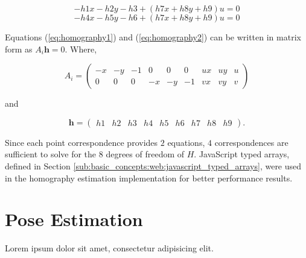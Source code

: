 \begin{equation}
\label{eq:homography1}
-h1x-h2y-h3 +(h7x+h8y+h9)u=0
\end{equation}
\begin{equation}
\label{eq:homography2}
-h4x-h5y-h6 +(h7x+h8y+h9)u=0
\end{equation}

Equations (\ref{eq:homography1}) and (\ref{eq:homography2}) can be written in matrix form as $A_i\textbf{h}=0$. Where,

$$A_i=\begin{pmatrix}-x & -y & -1 & 0 & 0 & 0 & ux & uy & u\\0 & 0 & 0 & -x & -y & -1 & vx & vy & v\end{pmatrix}$$

and

$$\textbf{h}=\begin{pmatrix}h1 & h2 & h3 & h4 & h5 & h6 & h7 & h8 & h9\end{pmatrix}.$$

Since each point correspondence provides $2$ equations, $4$ correspondences are sufficient to solve for the $8$ degrees of freedom of $H$. JavaScript typed arrays, defined in Section \ref{sub:basic_concepts:web:javascript_typed_arrays}, were used in the homography estimation implementation for better performance results.




\section{Pose Estimation} %
\label{sec:ar_library_for_the_web:pose_estimation}

Lorem ipsum dolor sit amet, consectetur adipisicing elit.


